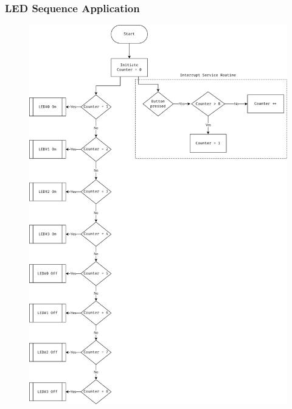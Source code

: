 \documentclass[10pt]{article}
\begin{document}
\subsubsection{LED Sequence Application}
\begin{figure}[H]
	\includegraphics[width=14cm]{led-sequence_v_2_0}
	\centering
\end{figure}
\end{document}
